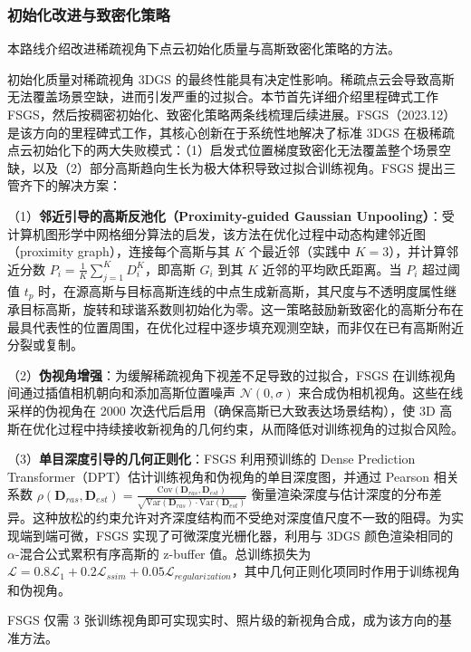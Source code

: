 \subsubsection{初始化改进与致密化策略}

本路线介绍改进稀疏视角下点云初始化质量与高斯致密化策略的方法。

初始化质量对稀疏视角 3DGS 的最终性能具有决定性影响。稀疏点云会导致高斯无法覆盖场景空缺，进而引发严重的过拟合。本节首先详细介绍里程碑式工作 FSGS，然后按稠密初始化、致密化策略两条线梳理后续进展。FSGS（2023.12）~\cite{2312_00451} 是该方向的里程碑式工作，其核心创新在于系统性地解决了标准 3DGS 在极稀疏点云初始化下的两大失败模式：（1）启发式位置梯度致密化无法覆盖整个场景空缺，以及（2）部分高斯趋向生长为极大体积导致过拟合训练视角。FSGS 提出三管齐下的解决方案：

（1）\textbf{邻近引导的高斯反池化（Proximity-guided Gaussian Unpooling）}：受计算机图形学中网格细分算法的启发，该方法在优化过程中动态构建邻近图（proximity graph），连接每个高斯与其 $K$ 个最近邻（实践中 $K{=}3$），并计算邻近分数 $P_i = \frac{1}{K}\sum_{j=1}^{K} D_i^K$，即高斯 $G_i$ 到其 $K$ 近邻的平均欧氏距离。当 $P_i$ 超过阈值 $t_p$ 时，在源高斯与目标高斯连线的中点生成新高斯，其尺度与不透明度属性继承目标高斯，旋转和球谐系数则初始化为零。这一策略鼓励新致密化的高斯分布在最具代表性的位置周围，在优化过程中逐步填充观测空缺，而非仅在已有高斯附近分裂或复制。

（2）\textbf{伪视角增强}：为缓解稀疏视角下视差不足导致的过拟合，FSGS 在训练视角间通过插值相机朝向和添加高斯位置噪声 $\mathcal{N}(0, \sigma)$ 来合成伪相机视角。这些在线采样的伪视角在 2000 次迭代后启用（确保高斯已大致表达场景结构），使 3D 高斯在优化过程中持续接收新视角的几何约束，从而降低对训练视角的过拟合风险。

（3）\textbf{单目深度引导的几何正则化}：FSGS 利用预训练的 Dense Prediction Transformer（DPT）估计训练视角和伪视角的单目深度图，并通过 Pearson 相关系数 $\rho(\mathbf{D}_{ras}, \mathbf{D}_{est}) = \frac{\mathrm{Cov}(\mathbf{D}_{ras}, \mathbf{D}_{est})}{\sqrt{\mathrm{Var}(\mathbf{D}_{ras}) \cdot \mathrm{Var}(\mathbf{D}_{est})}}$ 衡量渲染深度与估计深度的分布差异。这种放松的约束允许对齐深度结构而不受绝对深度值尺度不一致的阻碍。为实现端到端可微，FSGS 实现了可微深度光栅化器，利用与 3DGS 颜色渲染相同的 $\alpha$-混合公式累积有序高斯的 z-buffer 值。总训练损失为 $\mathcal{L} = 0.8 \mathcal{L}_1 + 0.2 \mathcal{L}_{ssim} + 0.05 \mathcal{L}_{regularization}$，其中几何正则化项同时作用于训练视角和伪视角。

FSGS 仅需 3 张训练视角即可实现实时、照片级的新视角合成，成为该方向的基准方法。

